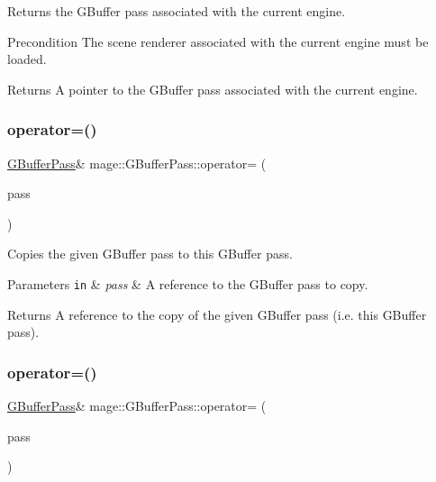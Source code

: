 Returns the G\+Buffer pass associated with the current engine.

\begin{DoxyPrecond}{Precondition}
The scene renderer associated with the current engine must be loaded. 
\end{DoxyPrecond}
\begin{DoxyReturn}{Returns}
A pointer to the G\+Buffer pass associated with the current engine. 
\end{DoxyReturn}
\hypertarget{classmage_1_1_g_buffer_pass_a8508a12bbce455330cea96044c7b24a9}{}\label{classmage_1_1_g_buffer_pass_a8508a12bbce455330cea96044c7b24a9} 
\subsubsection{\texorpdfstring{operator=()}{operator=()}\hspace{0.1cm}{\footnotesize\ttfamily [1/2]}}
{\footnotesize\ttfamily \hyperlink{classmage_1_1_g_buffer_pass}{G\+Buffer\+Pass}\& mage\+::\+G\+Buffer\+Pass\+::operator= (\begin{DoxyParamCaption}\item[{const \hyperlink{classmage_1_1_g_buffer_pass}{G\+Buffer\+Pass} \&}]{pass }\end{DoxyParamCaption})\hspace{0.3cm}{\ttfamily [delete]}}

Copies the given G\+Buffer pass to this G\+Buffer pass.


\begin{DoxyParams}[1]{Parameters}
\mbox{\tt in}  & {\em pass} & A reference to the G\+Buffer pass to copy. \\
\hline
\end{DoxyParams}
\begin{DoxyReturn}{Returns}
A reference to the copy of the given G\+Buffer pass (i.\+e. this G\+Buffer pass). 
\end{DoxyReturn}
\hypertarget{classmage_1_1_g_buffer_pass_ab5495a688674fcb7b789e7b0e728fd12}{}\label{classmage_1_1_g_buffer_pass_ab5495a688674fcb7b789e7b0e728fd12} 
\subsubsection{\texorpdfstring{operator=()}{operator=()}\hspace{0.1cm}{\footnotesize\ttfamily [2/2]}}
{\footnotesize\ttfamily \hyperlink{classmage_1_1_g_buffer_pass}{G\+Buffer\+Pass}\& mage\+::\+G\+Buffer\+Pass\+::operator= (\begin{DoxyParamCaption}\item[{\hyperlink{classmage_1_1_g_buffer_pass}{G\+Buffer\+Pass} \&\&}]{pass }\end{DoxyParamCaption})\hspace{0.3cm}{\ttfamily [delete]}}

